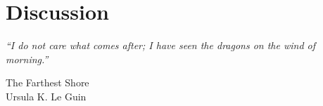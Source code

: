 \chapter{Discussion}\label{ch:discussion}
\epigraph{
    \emph{
        ``I do not care what comes after; I have seen the dragons on the wind of morning.''
} 
%
}
{The Farthest Shore\\Ursula K. Le Guin}
%

